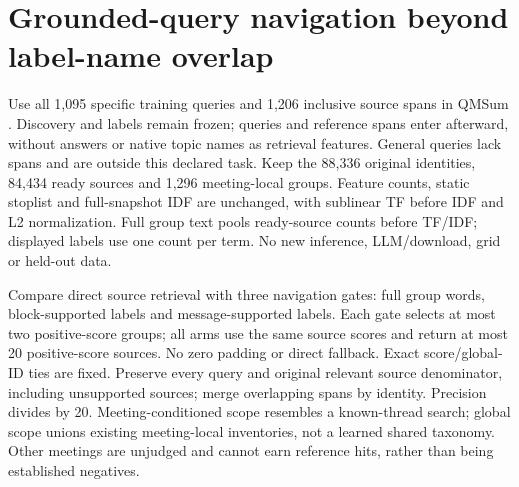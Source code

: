 \documentclass[11pt]{article}
\begin{document}
\section{Grounded-query navigation beyond label-name overlap}
Use all 1,095 specific training queries and 1,206 inclusive source spans in
QMSum \cite{zhong2021qmsum}. Discovery and labels remain frozen; queries and
reference spans enter afterward, without answers or native topic names as
retrieval features. General queries lack spans and are outside this declared
task. Keep the 88,336 original identities, 84,434 ready sources and 1,296
meeting-local groups. Feature counts, static stoplist and full-snapshot IDF
are unchanged, with sublinear TF before IDF and L2 normalization. Full group
text pools ready-source counts before TF/IDF; displayed labels use one count
per term. No new inference, LLM/download, grid or held-out data.

Compare direct source retrieval with three navigation gates: full group words,
block-supported labels and message-supported labels. Each gate selects at most
two positive-score groups; all arms use the same source scores and return at
most 20 positive-score sources. No zero padding or direct fallback. Exact
score/global-ID ties are fixed. Preserve every query and original relevant
source denominator, including unsupported sources; merge overlapping spans
by identity. Precision divides by 20. Meeting-conditioned scope resembles a
known-thread search; global scope unions existing meeting-local inventories,
not a learned shared taxonomy. Other meetings are unjudged and cannot earn
reference hits, rather than being established negatives.
\end{document}
